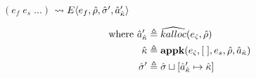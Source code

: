 \documentclass[12pt,draft]{article}
\begin{document}
{\begin{multicols*}{2}
\begin{center}
  $(e_f\;e_s\;...)$
  $\leadsto E\langle e_f , \hat{\rho} , \hat{\sigma}' , \hat{a}_{\hat{\kappa}}' \rangle$
\end{center}
\vspace{-7mm}
\begin{align*}
  \text{where }
  \hat{a}_{\hat{\kappa}}' &\triangleq \widehat{kalloc}(e_{\hat{\varsigma}} , \hat{\rho}) \\
  \hat{\kappa} &\triangleq \textbf{appk}(e_{\hat{\varsigma}} , [\;] , e_s , \hat{\rho} , \hat{a}_{\hat{\kappa}}) \\
  \hat{\sigma}' &\triangleq \hat{\sigma} \sqcup [\hat{a}_{\hat{\kappa}}' \mapsto \hat{\kappa}]
\end{align*}
\end{multicols*}
}

\newpage
\end{document}
